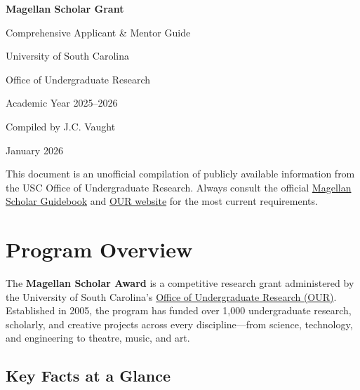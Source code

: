 \documentclass[11pt, letterpaper]{article}
\begin{document}
\begin{titlepage}
\centering
\vspace*{2cm}
{\Huge\bfseries\color{Garnet} Magellan Scholar Grant\par}
\vspace{0.5cm}
{\LARGE\color{Black90} Comprehensive Applicant \& Mentor Guide\par}
\vspace{1cm}
{\large University of South Carolina\par}
{\large Office of Undergraduate Research\par}
\vspace{1.5cm}
{\large\color{Black70} Academic Year 2025--2026\par}
\vspace{2cm}
{\normalsize Compiled by J.C. Vaught\par}
{\normalsize January 2026\par}
\vfill
{\small\color{Black50} This document is an unofficial compilation of publicly available information from the USC Office of Undergraduate Research. Always consult the official \href{https://sc.edu/about/offices_and_divisions/undergraduate_research/documents/mgs_guidebook.pdf}{Magellan Scholar Guidebook} and \href{https://sc.edu/about/offices_and_divisions/undergraduate_research/funding_opportunities/our_funding/magellan-scholar-award/}{OUR website} for the most current requirements.\par}
\end{titlepage}

\tableofcontents
\newpage

\section{Program Overview}

The \textbf{Magellan Scholar Award} is a competitive research grant administered by the University of South Carolina's \href{https://sc.edu/about/offices_and_divisions/undergraduate_research/}{Office of Undergraduate Research (OUR)}. Established in 2005, the program has funded over 1,000 undergraduate research, scholarly, and creative projects across every discipline---from science, technology, and engineering to theatre, music, and art.

\subsection{Key Facts at a Glance}
\end{document}
